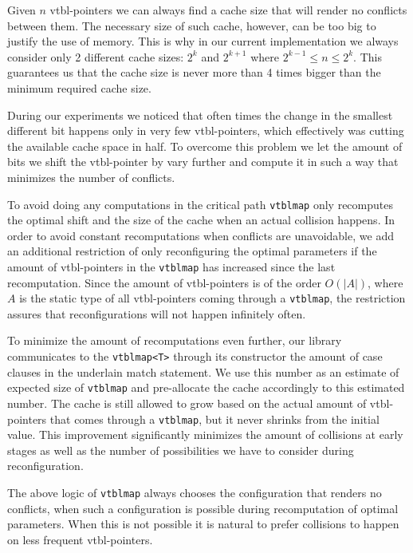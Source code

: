 \documentclass[preprint]{sigplanconf}
\makeatletter
\DeclareRobustCommand{\code}[1]{{\lstinline[breaklines=false,escapechar=@]{#1}}}
\makeatother
\begin{document}
Given $n$ vtbl-pointers we can always find a cache size that will render no 
conflicts between them. The necessary size of such cache, however, can be too 
big to justify the use of memory. This is why in our current implementation we 
always consider only 2 different cache sizes: $2^k$ and $2^{k+1}$ where $2^{k-1} 
\le n \leq 2^k$. This guarantees us that the cache size is never more than 4 
times bigger than the minimum required cache size.

During our experiments we noticed that often times the change in the smallest 
different bit happens only in very few vtbl-pointers, which effectively was 
cutting the available cache space in half. To overcome this problem we let the 
amount of bits we shift the vtbl-pointer by vary further and compute it in such 
a way that minimizes the number of conflicts.

To avoid doing any computations in the critical path \code{vtblmap} only 
recomputes the optimal shift and the size of the cache when an actual collision 
happens. In order to avoid constant recomputations when conflicts are unavoidable, 
we add an additional restriction of only reconfiguring the optimal parameters if 
the amount of vtbl-pointers in the \code{vtblmap} has increased since the last 
recomputation. Since the amount of vtbl-pointers is of the order $O(|A|)$, where 
$A$ is the static type of all vtbl-pointers coming through a \code{vtblmap}, the 
restriction assures that reconfigurations will not happen infinitely often.

To minimize the amount of recomputations even further, our library communicates 
to the \code{vtblmap<T>} through its constructor the amount of case clauses in 
the underlain match statement. We use this number as an estimate of expected 
size of \code{vtblmap} and pre-allocate the cache accordingly to this estimated 
number. The cache is still allowed to grow based on the actual amount of 
vtbl-pointers that comes through a \code{vtblmap}, but it never shrinks from the
initial value. This improvement significantly minimizes the amount of collisions 
at early stages as well as the number of possibilities we have to consider 
during reconfiguration.

The above logic of \code{vtblmap} always chooses the configuration that renders 
no conflicts, when such a configuration is possible during recomputation of 
optimal parameters. When this is not possible it is natural to prefer collisions 
to happen on less frequent vtbl-pointers.
\end{document}
